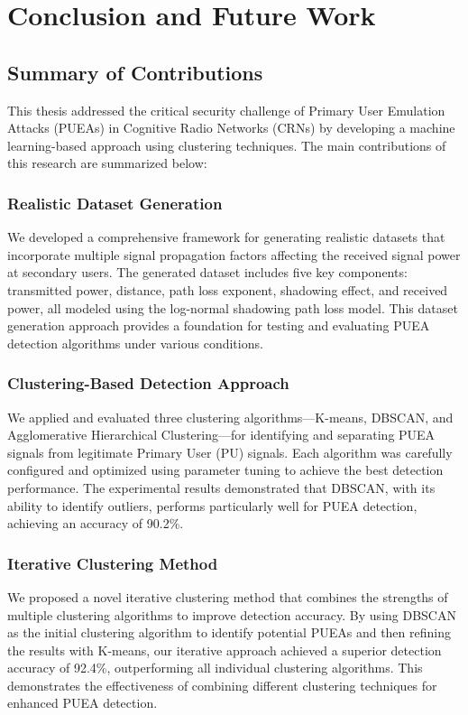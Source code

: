 \chapter{Conclusion and Future Work}

\section{Summary of Contributions}
This thesis addressed the critical security challenge of Primary User Emulation Attacks (PUEAs) in Cognitive Radio Networks (CRNs) by developing a machine learning-based approach using clustering techniques. The main contributions of this research are summarized below:

\subsection{Realistic Dataset Generation}
We developed a comprehensive framework for generating realistic datasets that incorporate multiple signal propagation factors affecting the received signal power at secondary users. The generated dataset includes five key components: transmitted power, distance, path loss exponent, shadowing effect, and received power, all modeled using the log-normal shadowing path loss model. This dataset generation approach provides a foundation for testing and evaluating PUEA detection algorithms under various conditions.

\subsection{Clustering-Based Detection Approach}
We applied and evaluated three clustering algorithms—K-means, DBSCAN, and Agglomerative Hierarchical Clustering—for identifying and separating PUEA signals from legitimate Primary User (PU) signals. Each algorithm was carefully configured and optimized using parameter tuning to achieve the best detection performance. The experimental results demonstrated that DBSCAN, with its ability to identify outliers, performs particularly well for PUEA detection, achieving an accuracy of 90.2\%.

\subsection{Iterative Clustering Method}
We proposed a novel iterative clustering method that combines the strengths of multiple clustering algorithms to improve detection accuracy. By using DBSCAN as the initial clustering algorithm to identify potential PUEAs and then refining the results with K-means, our iterative approach achieved a superior detection accuracy of 92.4\%, outperforming all individual clustering algorithms. This demonstrates the effectiveness of combining different clustering techniques for enhanced PUEA detection.

